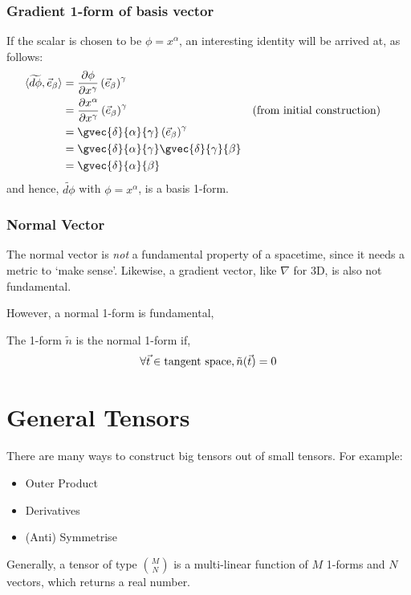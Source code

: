 \subsubsection{Gradient 1-form of basis vector}
If the scalar is chosen to be $\phi = x^\alpha$, an interesting identity will be arrived at, as follows:
\begin{align*}
    \langle \widetilde{d\phi}, \vec{e}_\beta \rangle & = \frac{\partial \phi}{\partial x^\gamma} \left(\vec{e}_\beta\right)^\gamma \\
    & = \frac{\partial x^\alpha}{\partial x^\gamma} \left(\vec{e}_\beta\right)^\gamma && \text{(from initial construction)} \\
    & = \gvec{\delta}{\alpha}{\gamma}\left(\vec{e}_\beta\right)^\gamma \\
    & = \gvec{\delta}{\alpha}{\gamma}\gvec{\delta}{\gamma}{\beta} \\
    & = \gvec{\delta}{\alpha}{\beta}
\end{align*}
and hence, $\widetilde{d\phi}$ with $\phi = x^\alpha$, is a basis 1-form.

\subsubsection{Normal Vector}
The normal vector is \textit{not} a fundamental property of a spacetime, since it needs a metric to `make sense'. Likewise, a gradient vector, like $\nabla$ for 3D, is  also not fundamental. \par However, a normal 1-form is fundamental, 
\begin{definition}
    The 1-form $\widetilde{n}$ is the normal 1-form if, $$\forall \vec{t} \in \text{tangent space}, \Tilde{n}(\vec{t}) = 0$$
\end{definition}

\section{General Tensors}
There are many ways to construct big tensors out of small tensors. For example:
\begin{itemize}
    \item Outer Product
    \item Derivatives
    \item (Anti) Symmetrise
\end{itemize}

Generally, a tensor of type $\binom{M}{N}$ is a multi-linear function of $M$ 1-forms and $N$ vectors, which returns a real number.

